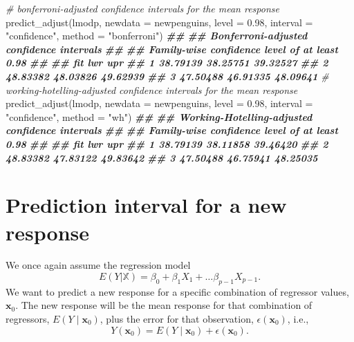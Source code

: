 \documentclass[
]{book}
\newenvironment{Shaded}{\begin{snugshade}}{\end{snugshade}}
\newcommand{\AttributeTok}[1]{\textcolor[rgb]{0.77,0.63,0.00}{#1}}
\newcommand{\CommentTok}[1]{\textcolor[rgb]{0.56,0.35,0.01}{\textit{#1}}}
\newcommand{\DocumentationTok}[1]{\textcolor[rgb]{0.56,0.35,0.01}{\textbf{\textit{#1}}}}
\newcommand{\FloatTok}[1]{\textcolor[rgb]{0.00,0.00,0.81}{#1}}
\newcommand{\FunctionTok}[1]{\textcolor[rgb]{0.00,0.00,0.00}{#1}}
\newcommand{\NormalTok}[1]{#1}
\newcommand{\StringTok}[1]{\textcolor[rgb]{0.31,0.60,0.02}{#1}}
\theoremstyle{definition}
\theoremstyle{definition}
\theoremstyle{definition}
\theoremstyle{definition}
\theoremstyle{remark}
\begin{document}
\begin{Shaded}
\begin{Highlighting}[]
\CommentTok{\# bonferroni{-}adjusted confidence intervals for the mean response}
\FunctionTok{predict\_adjust}\NormalTok{(lmodp, }\AttributeTok{newdata =}\NormalTok{ newpenguins, }\AttributeTok{level =} \FloatTok{0.98}\NormalTok{,}
               \AttributeTok{interval =} \StringTok{"confidence"}\NormalTok{, }\AttributeTok{method =} \StringTok{"bonferroni"}\NormalTok{)}
\DocumentationTok{\#\# }
\DocumentationTok{\#\# Bonferroni{-}adjusted confidence intervals}
\DocumentationTok{\#\# }
\DocumentationTok{\#\# Family{-}wise confidence level of at least 0.98 }
\DocumentationTok{\#\# }
\DocumentationTok{\#\#        fit      lwr      upr}
\DocumentationTok{\#\# 1 38.79139 38.25751 39.32527}
\DocumentationTok{\#\# 2 48.83382 48.03826 49.62939}
\DocumentationTok{\#\# 3 47.50488 46.91335 48.09641}
\CommentTok{\# working{-}hotelling{-}adjusted confidence intervals for the mean response}
\FunctionTok{predict\_adjust}\NormalTok{(lmodp, }\AttributeTok{newdata =}\NormalTok{ newpenguins, }\AttributeTok{level =} \FloatTok{0.98}\NormalTok{,}
               \AttributeTok{interval =} \StringTok{"confidence"}\NormalTok{, }\AttributeTok{method =} \StringTok{"wh"}\NormalTok{)}
\DocumentationTok{\#\# }
\DocumentationTok{\#\# Working{-}Hotelling{-}adjusted confidence intervals}
\DocumentationTok{\#\# }
\DocumentationTok{\#\# Family{-}wise confidence level of at least 0.98 }
\DocumentationTok{\#\# }
\DocumentationTok{\#\#        fit      lwr      upr}
\DocumentationTok{\#\# 1 38.79139 38.11858 39.46420}
\DocumentationTok{\#\# 2 48.83382 47.83122 49.83642}
\DocumentationTok{\#\# 3 47.50488 46.75941 48.25035}
\end{Highlighting}
\end{Shaded}

\hypertarget{pi-new-response}{%
\section{Prediction interval for a new response}\label{pi-new-response}}

We once again assume the regression model
\[
E(Y|\mathbb{X})=\beta_0+\beta_1 X_1 + \ldots \beta_{p-1} X_{p-1}.
\]
We want to predict a new response for a specific combination of regressor values, \(\mathbf{x}_0\). The new response will be the mean response for that combination of regressors, \(E(Y\mid \mathbf{x}_0)\), plus the error for that observation, \(\epsilon(\mathbf{x}_0)\), i.e.,
\[
Y(\mathbf{x}_0)=E(Y\mid \mathbf{x}_0) + \epsilon(\mathbf{x}_0).
\]
\end{document}
